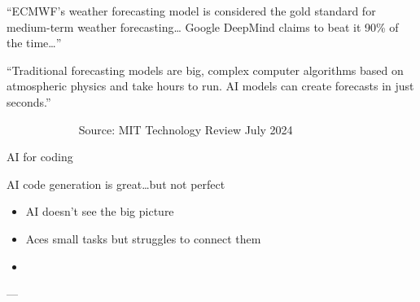 \begin{frame}

    
    ``ECMWF's weather forecasting model is considered the gold standard for
        medium-term weather forecasting\ldots 
        Google DeepMind claims to beat it 90\% of the time\ldots''

    \vspace{0.5em}
    \vspace{0.5em}

    ``Traditional forecasting models are big, complex computer algorithms based
    on atmospheric physics and take hours to run. AI models can create forecasts
    in just seconds.'' 
    \vspace{0.5em}
    \vspace{0.5em}

    $\quad \qquad$$\quad \qquad$ Source: MIT Technology Review  July 2024



\end{frame}

\begin{frame}{AI for coding}
    
    \begin{figure}
       \centering
    \end{figure}

\end{frame}

\begin{frame}
    
    AI code generation is great\ldots but not perfect


    \begin{itemize}
        \item AI doesn't see the big picture
        \vspace{0.5em}
        \item Aces small tasks but struggles to connect them 
        \vspace{0.5em}
        \item {}
    \end{itemize}

    \begin{center}
        --- 
    \end{center}

\end{frame}


